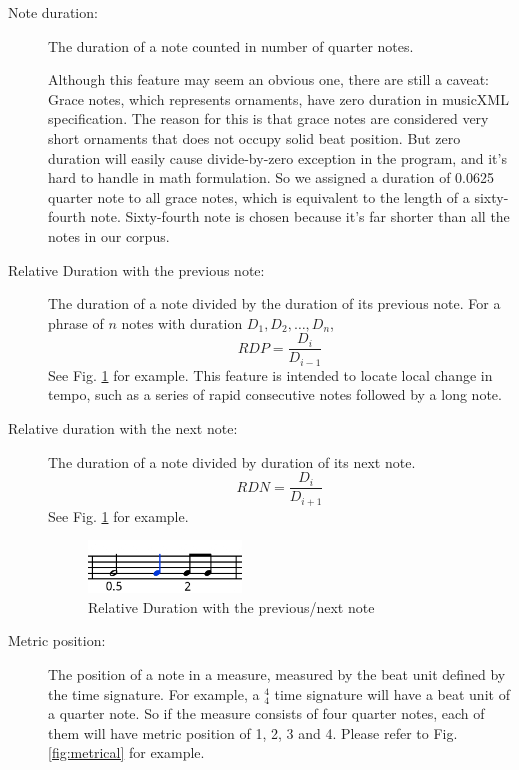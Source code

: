 \begin{description}
         
         \item [Note duration:] The duration of a note counted in number of quarter notes. 
            
            Although this feature may seem an obvious one, there are still a caveat: Grace notes, which represents ornaments, have zero duration in musicXML specification. The reason for this is that grace notes are considered very short ornaments that does not occupy solid beat position. But zero duration will easily cause divide-by-zero exception in the program, and it's hard to handle in math formulation. So we assigned a duration of 0.0625 quarter note to all grace notes, which is equivalent to the length of a sixty-fourth note. Sixty-fourth note is chosen because it's far shorter than all the notes in our corpus.
         \item [Relative Duration with the previous note:] The duration of a note divided by the duration of its previous note. For a phrase of $n$ notes with duration $D_1, D_2, \dots, D_n$, $$RDP = \frac{D_i}{D_{i-1}} $$ See Fig. \ref{fig:duration} for example.
            This feature is intended to locate local change in tempo, such as a series of rapid consecutive notes followed by a long note.
         \item [Relative duration with the next note:] The duration of a note divided by duration of its next note. $$RDN = \frac{D_i}{D_{i+1}} $$ See Fig. \ref{fig:duration} for example.

      \begin{figure}[tp]
         \begin{center}
            \includegraphics[width=0.4\textwidth]{fig/duration}
         \end{center}
         \caption{Relative Duration with the previous/next note}
         \label{fig:duration}
      \end{figure}
   \item [Metric position:] The position of a note in a measure, measured by the beat unit defined by the time signature. For example, a $^4_4$ time signature will have a beat unit of a quarter note. So if the measure consists of four quarter notes, each of them will have metric position of 1, 2, 3 and 4. Please refer to Fig. \ref{fig:metrical} for example.
      

\end{description}
